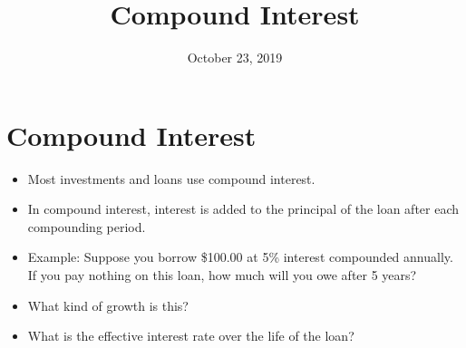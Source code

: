 \documentclass{article}
\title{Compound Interest}
\date{October 23, 2019}
\begin{document}
\maketitle
\section{Compound Interest}
\begin{itemize}
    \item Most investments and loans use compound interest.
    \item In compound interest, interest is added to the principal
        of the loan after each compounding period.
    \item Example:  Suppose you borrow \$100.00 at 5\% interest
        compounded annually. If you pay nothing on this loan, how much
        will you owe after 5 years?
    \item What kind of growth is this?
    \item What is the effective interest rate over the life of the
        loan?
\end{itemize}
\end{document}

